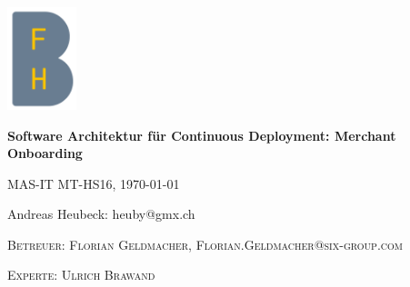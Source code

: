 \graphicspath{{./images/}}

\begin{titlepage}
	\raggedright
	\includegraphics[width=0.15\textwidth]{bfhlogo.png}\par\vspace{1cm}
	\vspace{2cm}
	{\huge\bfseries Software Architektur für Continuous Deployment: Merchant Onboarding\par}
	\vspace{2cm}
	{\large MAS-IT MT-HS16, \today\par}
	\vspace{1cm}
	{\large Andreas Heubeck: heuby@gmx.ch\par}
	\vfill
	\vspace{3cm}
	
	\textsc{Betreuer: Florian Geldmacher, Florian.Geldmacher@six-group.com}\par
	\textsc{Experte: Ulrich Brawand}

	\vfill

\end{titlepage}